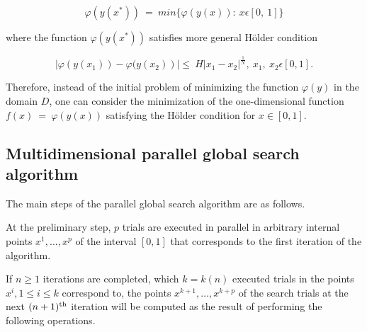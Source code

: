 \documentclass{svproc}
\begin{document}
\begin{displaymath}
	\varphi(y(x^\ast))\ =\ min\{\varphi(y(x)):\ x\epsilon[0,\ 1]\}
\end{displaymath}


where the function $\varphi(y(x^\ast))$ satisfies more general H{\"o}lder condition

\begin{displaymath}
	\left|\varphi (y \left(x_1\right))- \varphi (y \left(x_2\right)\right )|\le\ H\left|x_1-x_2\right|^\frac{1}{N},\ x_1,\ x_2\epsilon[0,1].
\end{displaymath} 


Therefore, instead of the initial problem of minimizing the function $\varphi(y)$ in the domain $D$,  one can consider the minimization of the one-dimensional function $f(x)\ =\ \varphi(y(x))$ satisfying  the H{\"o}lder condition for $ x\in [0,1]$.



\subsection{Multidimensional parallel global search algorithm}\label{SecGSA}

The main steps of the parallel global search algorithm are as follows.

At the preliminary step, $p$ trials are executed in parallel in arbitrary internal points $x^1, ...,x^p$ of  the interval $[0,1]$ that corresponds to the first iteration of the algorithm. 

If $n \geq 1$ iterations are completed, which $k=k(n)$ executed trials in the points $x^i, 1\leq i\leq  k$ correspond to, the points $x^{k+1},\ldots,x^{k+p}$ of the search trials at the next $(n+1)^{\rm  th}$ iteration will be computed as the result of performing the following operations.
\end{document}
